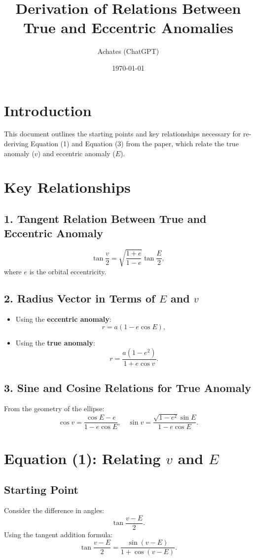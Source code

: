 \documentclass[11pt]{article}
\title{Derivation of Relations Between True and Eccentric Anomalies}
\author{Achates (ChatGPT)}
\date{\today}
\begin{document}
\maketitle

\section*{Introduction}
This document outlines the starting points and key relationships necessary for re-deriving Equation (1) and Equation (3) from the paper, which relate the true anomaly (\(v\)) and eccentric anomaly (\(E\)).

\section*{Key Relationships}
\subsection*{1. Tangent Relation Between True and Eccentric Anomaly}
\begin{equation}
\tan\frac{v}{2} = \sqrt{\frac{1 + e}{1 - e}} \tan\frac{E}{2},
\end{equation}
where \(e\) is the orbital eccentricity.

\subsection*{2. Radius Vector in Terms of \(E\) and \(v\)}
\begin{itemize}
    \item Using the \textbf{eccentric anomaly}:
    \[
    r = a(1 - e \cos E),
    \]
    \item Using the \textbf{true anomaly}:
    \[
    r = \frac{a(1 - e^2)}{1 + e \cos v}.
    \]
\end{itemize}

\subsection*{3. Sine and Cosine Relations for True Anomaly}
From the geometry of the ellipse:
\[
\cos v = \frac{\cos E - e}{1 - e \cos E}, \quad \sin v = \frac{\sqrt{1 - e^2} \sin E}{1 - e \cos E}.
\]

\section*{Equation (1): Relating \(v\) and \(E\)}
\subsection*{Starting Point}
Consider the difference in angles:
\[
\tan\frac{v - E}{2}.
\]
Using the tangent addition formula:
\[
\tan\frac{v - E}{2} = \frac{\sin(v - E)}{1 + \cos(v - E)}.
\]
\end{document}
